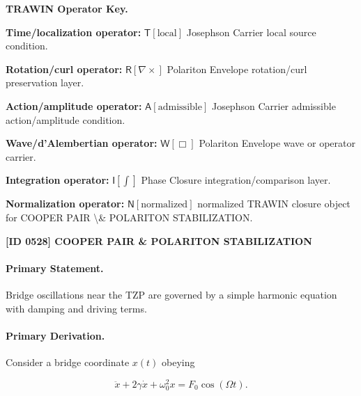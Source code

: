 \par\vspace{0.45\baselineskip}
\noindent\begin{minipage}[t]{\linewidth}
\begingroup
\small
\raggedright
\textbf{TRAWIN Operator Key.}\par
\noindent\textbf{Time/localization operator:} $\mathsf{T}\!\left[\mathrm{local}\right]$ Josephson Carrier local source condition.\par
\noindent\textbf{Rotation/curl operator:} $\mathsf{R}\!\left[\nabla\times\right]$ Polariton Envelope rotation/curl preservation layer.\par
\noindent\textbf{Action/amplitude operator:} $\mathsf{A}\!\left[\mathrm{admissible}\right]$ Josephson Carrier admissible action/amplitude condition.\par
\noindent\textbf{Wave/d'Alembertian operator:} $\mathsf{W}\!\left[\Box\right]$ Polariton Envelope wave or operator carrier.\par
\noindent\textbf{Integration operator:} $\mathsf{I}\!\left[\int\right]$ Phase Closure integration/comparison layer.\par
\noindent\textbf{Normalization operator:} $\mathsf{N}\!\left[\mathrm{normalized}\right]$ normalized TRAWIN closure object for COOPER PAIR \textbackslash{}\& POLARITON STABILIZATION.\par
\endgroup
\end{minipage}

\clearpage
\noindent\textbf{[ID 0528] COOPER PAIR \& POLARITON STABILIZATION}\par
\vspace{0.35em}
\paragraph{Primary Statement.}

Bridge oscillations near the TZP are governed by a simple harmonic equation with damping and driving terms.

\paragraph{Primary Derivation.}

Consider a bridge coordinate $x(t)$ obeying

\begin{equation}
\ddot{x} + 2\gamma\dot{x} + \omega_0^2 x = F_0\cos(\Omega t).
\end{equation}

